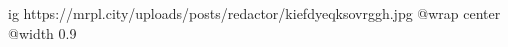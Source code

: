  
 
 
 
 

\ifcmt
  ig https://mrpl.city/uploads/posts/redactor/kiefdyeqksovrggh.jpg
  @wrap center
  @width 0.9
\fi
